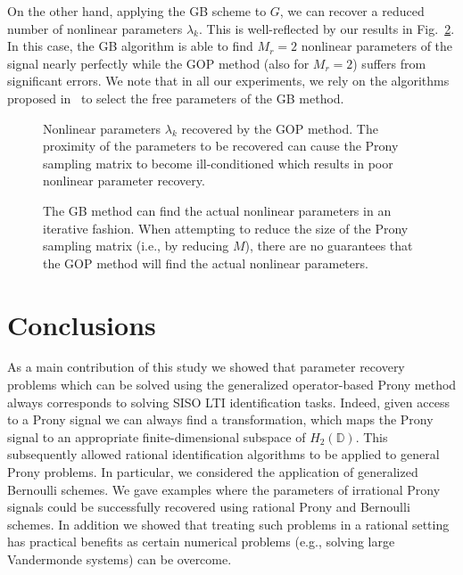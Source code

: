 \documentclass{arxiv}
\begin{document}
On the other hand, applying the GB scheme to $G$, we can recover a reduced number of nonlinear parameters $\lambda_k$. This is well-reflected by our results in Fig.~\ref{fig:RKHS2}. In this case, the GB algorithm is able to find $M_r = 2$ nonlinear parameters of the signal nearly perfectly while the GOP method (also for $M_r = 2$) suffers from significant errors. We note that in all our experiments, we rely on the algorithms proposed in~\cite{siamdozsa} to select the free parameters of the GB method.


\begin{figure}[bt]
    \centering
    
    \caption{Nonlinear parameters $\lambda_k$ recovered by the GOP  method. The proximity of the parameters to be recovered can cause the Prony sampling matrix to become ill-conditioned which results in poor nonlinear parameter recovery.}
    \label{fig:RKHS}
\end{figure}

\begin{figure}[bt]
    \centering
    
    \caption{The GB  method can find the actual nonlinear parameters in an iterative fashion. When attempting to reduce the size of the Prony sampling matrix (i.e., by reducing $M$), there are no guarantees that the GOP method will find the actual nonlinear parameters.}
    \label{fig:RKHS2}
\end{figure}


\section{Conclusions}
\label{sec:conc}

As a main contribution of this study we showed that parameter recovery problems which can be solved using the generalized operator-based Prony method always corresponds to solving SISO LTI identification tasks. Indeed, given access to a Prony signal we can always find a transformation, which maps the Prony signal to an appropriate finite-dimensional subspace of $H_2(\mathbb{D})$. This subsequently allowed rational identification algorithms to be applied to general Prony problems. In particular, we considered the application of generalized Bernoulli schemes. We gave examples where the parameters of irrational Prony signals could be successfully recovered using rational Prony and Bernoulli schemes. In addition we showed that treating such problems in a rational setting has practical benefits as certain numerical problems (e.g., solving large Vandermonde systems) can be overcome.
\end{document}
